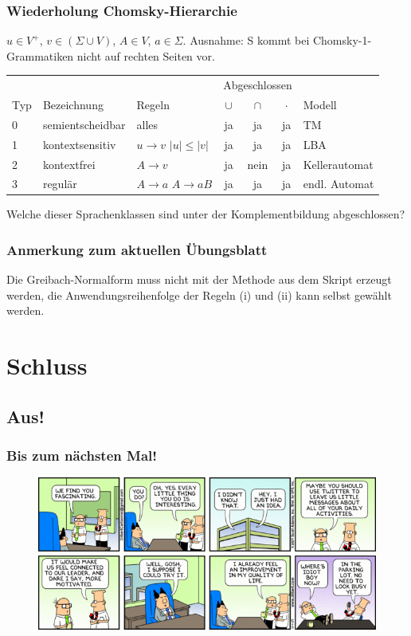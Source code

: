 \begin{frame}
 \frametitle{Wiederholung Chomsky-Hierarchie}
 $u \in V^+$, $v \in (\Sigma \cup V)$, $A \in V$, $a \in \Sigma$.
  Ausnahme: S kommt bei Chomsky-1-Grammatiken nicht auf rechten Seiten vor.
 \begin{table}
 \begin{center}
 \begin{tabular}{| l | l | p{1.4cm} | c | c | c | l |}
 \hline
 & & & \multicolumn{3}{|c|}{Abgeschlossen} &\\
 Typ & Bezeichnung & Regeln & $\cup$ & $\cap$ & $\cdot$ & Modell\\ \hline
 0 & semientscheidbar & alles & ja & ja & ja & TM \\ \hline
 1 & kontextsensitiv & $u \rightarrow v$ $|u| \leq |v|$ & ja & ja & ja &  LBA \\ \hline
 2 & kontextfrei & $A \rightarrow v$ & ja & nein & ja & Kellerautomat \\ \hline
 3 & regulär & $A \rightarrow a$  $A \rightarrow aB$ & ja & ja & ja & endl. Automat \\ \hline
 \end{tabular}
 \end{center}
 \end{table}

Welche dieser Sprachenklassen sind unter der Komplementbildung abgeschlossen?
\end{frame}

\begin{frame}
 \frametitle{Anmerkung zum aktuellen Übungsblatt}
 Die Greibach-Normalform muss nicht mit der Methode aus dem Skript erzeugt werden,
 die Anwendungsreihenfolge der Regeln (i) und (ii) kann selbst gewählt werden.
\end{frame}

\section{Schluss}
\subsection{Aus!}
\begin{frame}
\frametitle{Bis zum nächsten Mal!}
	\begin{figure}[H]
		\includegraphics[width= \textwidth]{images/dilbert-69231}
	\end{figure}
\end{frame}


